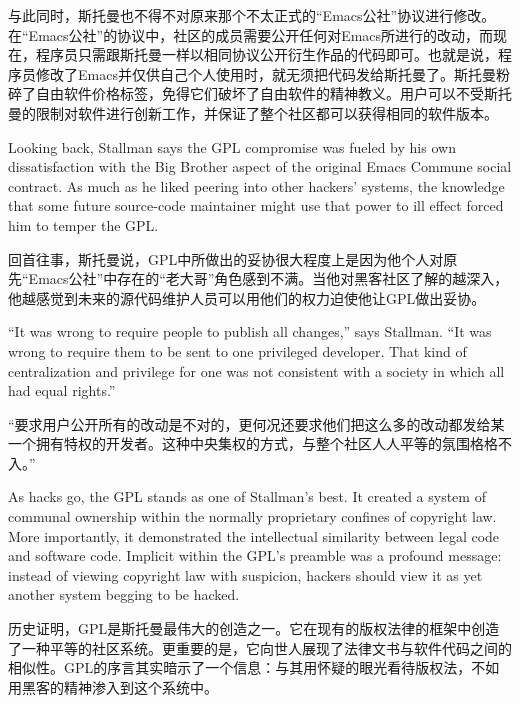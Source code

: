 \ifdefined\chs
与此同时，斯托曼也不得不对原来那个不太正式的``Emacs公社''协议进行修改。在``Emacs公社''的协议中，社区的成员需要公开任何对Emacs所进行的改动，而现在，程序员只需跟斯托曼一样以相同协议公开衍生作品的代码即可。也就是说，程序员修改了Emacs并仅供自己个人使用时，就无须把代码发给斯托曼了。斯托曼粉碎了自由软件价格标签，免得它们破坏了自由软件的精神教义。用户可以不受斯托曼的限制对软件进行创新工作，并保证了整个社区都可以获得相同的软件版本。
\fi

\ifdefined\eng
Looking back, Stallman says the GPL compromise was fueled by his own dissatisfaction with the Big Brother aspect of the original Emacs Commune social contract. As much as he liked peering into other hackers' systems, the knowledge that some future source-code maintainer might use that power to ill effect forced him to temper the GPL.
\fi

\ifdefined\chs
回首往事，斯托曼说，GPL中所做出的妥协很大程度上是因为他个人对原先``Emacs公社''中存在的``老大哥''角色感到不满。当他对黑客社区了解的越深入，他越感觉到未来的源代码维护人员可以用他们的权力迫使他让GPL做出妥协。
\fi

\ifdefined\eng
``It was wrong to require people to publish all changes,'' says Stallman. ``It was wrong to require them to be sent to one privileged developer. That kind of centralization and privilege for one was not consistent with a society in which all had equal rights.''
\fi

\ifdefined\chs
``要求用户公开所有的改动是不对的，更何况还要求他们把这么多的改动都发给某一个拥有特权的开发者。这种中央集权的方式，与整个社区人人平等的氛围格格不入。''
\fi

\ifdefined\eng
As hacks go, the GPL stands as one of Stallman's best. It created a system of communal ownership within the normally proprietary confines of copyright law. More importantly, it demonstrated the intellectual similarity between legal code and software code. Implicit within the GPL's preamble was a profound message: instead of viewing copyright law with suspicion, hackers should view it as yet another system begging to be hacked.
\fi

\ifdefined\chs
历史证明，GPL是斯托曼最伟大的创造之一。它在现有的版权法律的框架中创造了一种平等的社区系统。更重要的是，它向世人展现了法律文书与软件代码之间的相似性。GPL的序言其实暗示了一个信息：与其用怀疑的眼光看待版权法，不如用黑客的精神渗入到这个系统中。
\fi

